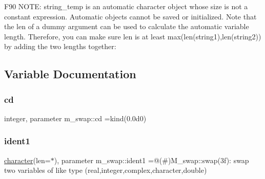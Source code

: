 F90 N\+O\+TE\+: string\+\_\+temp is an automatic character object whose size is not a constant expression. Automatic objects cannot be saved or initialized. Note that the len of a dummy argument can be used to calculate the automatic variable length. Therefore, you can make sure len is at least max(len(string1),len(string2)) by adding the two lengths together\+: 

\subsection{Variable Documentation}
\mbox{\label{namespacem__swap_af14229bde3625fba5d65e401fd16c3d1}} 
\subsubsection{\texorpdfstring{cd}{cd}}
{\footnotesize\ttfamily integer, parameter m\+\_\+swap\+::cd =kind(0.\+0d0)}

\mbox{\label{namespacem__swap_a01034a0ba775ff397c911bd715dd6d3f}} 
\subsubsection{\texorpdfstring{ident1}{ident1}}
{\footnotesize\ttfamily \hyperlink{option__stopwatch_83_8txt_abd4b21fbbd175834027b5224bfe97e66}{character}(len=$\ast$), parameter m\+\_\+swap\+::ident1 =\textquotesingle{}@(\#)M\+\_\+swap\+::swap(3f)\+: swap two variables of like type (real,integer,complex,character,double)\textquotesingle{}\hspace{0.3cm}{\ttfamily [private]}}

